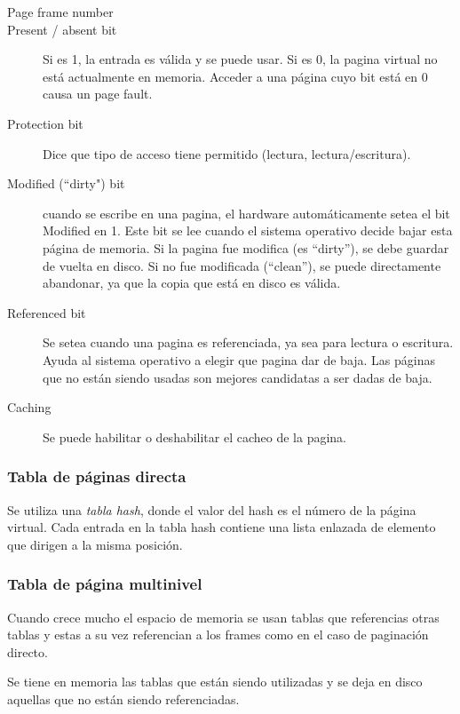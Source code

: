 \documentclass[a4paper, twoside]{article}
\begin{document}
\begin{description}
  \item[Page frame number]

  \item[Present / absent bit] Si es 1, la entrada es válida y se puede usar.
  Si es 0, la pagina virtual no está actualmente en memoria.
  Acceder a una página cuyo bit está en 0 causa un page fault.

  \item[Protection bit] Dice que tipo de acceso tiene permitido
  (lectura, lectura/escritura).

  \item[Modified (“dirty") bit] cuando se escribe en una pagina, el hardware
  automáticamente setea el bit Modified en 1.
  Este bit se lee cuando el sistema operativo decide bajar esta página de
  memoria.
  Si la pagina fue modifica (es “dirty”), se debe guardar de vuelta en disco.
  Si no fue modificada (“clean”), se puede directamente abandonar, ya que la
  copia que está en disco es válida.

  \item[Referenced bit] Se setea cuando una pagina es referenciada, ya sea para
  lectura o escritura.
  Ayuda al sistema operativo a elegir que pagina dar de baja.
  Las páginas que no están siendo usadas son mejores candidatas a ser dadas de
  baja.

  \item[Caching] Se puede habilitar o deshabilitar el cacheo de la pagina.
\end{description}

\subsubsection{Tabla de páginas directa}

Se utiliza una \emph{tabla hash}, donde el valor del hash es el número de la
página virtual.
Cada entrada en la tabla hash contiene una lista enlazada de elemento que
dirigen a la misma posición.

\subsubsection{Tabla de página multinivel}

Cuando crece mucho el espacio de memoria se usan tablas que referencias otras
tablas y estas a su vez referencian a los frames como en el caso de paginación
directo.

Se tiene en memoria las tablas que están siendo utilizadas y se deja en disco
aquellas que no están siendo referenciadas.
\end{document}
